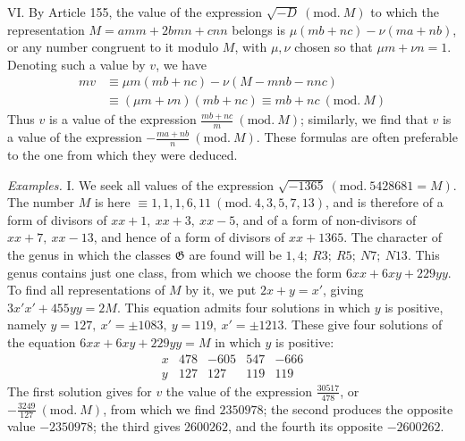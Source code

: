VI. By Article 155, the value of the expression \(\surd{-D}\ (\mathrm{mod.}\ M)\) to which the representation \(M=amm+2bmn+cnn\) belongs is \(\mu(mb+nc)-\nu(ma+nb)\), or any number congruent to it modulo \(M\), with \(\mu,\allowbreak \nu\) chosen so that \(\mu m+\nu n=1\). Denoting such a value by \(v\), we have \[\begin{aligned}
mv&\equiv\mu m(mb+nc)-\nu(M-mnb-nnc)\\
&\equiv(\mu m+\nu n)(mb+nc)\equiv mb+nc\ (\mathrm{mod.}\ M)
\end{aligned}\] Thus \(v\) is a value of the expression \(\frac{mb+nc}{m}\ (\mathrm{mod.}\ M)\); similarly, we find that \(v\) is a value of the expression \(-\frac{ma+nb}{n}\ (\mathrm{mod.}\ M)\). These formulas are often preferable to the one from which they were deduced.

\textit{Examples.} I. We seek all values of the expression \(\surd{-1365}\ (\mathrm{mod.}\ 5428681=M)\). The number \(M\) is here \(\equiv1,\allowbreak 1,\allowbreak 1,\allowbreak 6,\allowbreak 11\ (\mathrm{mod.}\ 4,\allowbreak 3,\allowbreak 5,\allowbreak 7,\allowbreak 13)\), and is therefore of a form of divisors of \(xx+1,\allowbreak \ xx+3,\allowbreak \ xx-5\), and of a form of non-divisors of \(xx+7,\allowbreak \ xx-13\), and hence of a form of divisors of \(xx+1365\). The character of the genus in which the classes \(\mathfrak G\) are found will be \(1,\allowbreak 4;\allowbreak \ R3;\allowbreak \ R5;\allowbreak \ N7;\allowbreak \ N13\). This genus contains just one class, from which we choose the form \(6xx+6xy+229yy\). To find all representations of \(M\) by it, we put \(2x+y=x'\), giving \(3x'x'+455yy=2M\). This equation admits four solutions in which \(y\) is positive, namely \(y=127,\allowbreak \ x'=\pm1083,\allowbreak \ y=119,\allowbreak \ x'=\pm1213\). These give four solutions of the equation \(6xx+6xy+229yy=M\) in which \(y\) is positive: \[\renewcommand{\arraystretch}{1.25}\begin{array}{c|r|r|r|r}x&478&-605&547&-666\\y&127&127&119&119\end{array}\] The first solution gives for \(v\) the value of the expression \(\frac{30517}{478}\), or \(-\frac{3249}{127}\ (\mathrm{mod.}\ M)\), from which we find
\(2350978\); the second produces the opposite value \(-2350978\); the third gives \(2600262\), and the fourth its opposite \(-2600262\).

